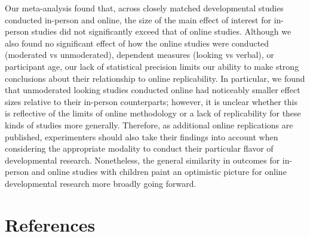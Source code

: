\documentclass[
  man,floatsintext]{apa6}
\begin{document}
Our meta-analysis found that, across closely matched developmental studies conducted in-person and online, the size of the main effect of interest for in-person studies did not significantly exceed that of online studies. Although we also found no significant effect of how the online studies were conducted (moderated vs unmoderated), dependent measures (looking vs verbal), or participant age, our lack of statistical precision limits our ability to make strong conclusions about their relationship to online replicability. In particular, we found that unmoderated looking studies conducted online had noticeably smaller effect sizes relative to their in-person counterparts; however, it is unclear whether this is reflective of the limits of online methodology or a lack of replicability for these kinds of studies more generally. Therefore, as additional online replications are published, experimenters should also take their findings into account when considering the appropriate modality to conduct their particular flavor of developmental research. Nonetheless, the general similarity in outcomes for in-person and online studies with children paint an optimistic picture for online developmental research more broadly going forward.

\newpage

\hypertarget{references}{%
\section{References}\label{references}}
\end{document}
